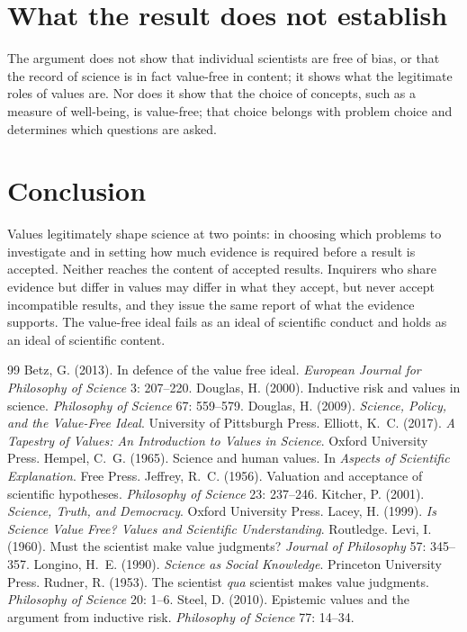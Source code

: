 \documentclass{situationist-preprint}
\begin{document}
\section{What the result does not establish}

The argument does not show that individual scientists are free of bias, or that the record of science is in fact value-free in content; it shows what the legitimate roles of values are. Nor does it show that the choice of concepts, such as a measure of well-being, is value-free; that choice belongs with problem choice and determines which questions are asked.

\section{Conclusion}

Values legitimately shape science at two points: in choosing which problems to investigate and in setting how much evidence is required before a result is accepted. Neither reaches the content of accepted results. Inquirers who share evidence but differ in values may differ in what they accept, but never accept incompatible results, and they issue the same report of what the evidence supports. The value-free ideal fails as an ideal of scientific conduct and holds as an ideal of scientific content.

\begin{thebibliography}{99}\small
{} Betz, G. (2013). In defence of the value free ideal. \emph{European Journal for Philosophy of Science} 3: 207--220.
 Douglas, H. (2000). Inductive risk and values in science. \emph{Philosophy of Science} 67: 559--579.
 Douglas, H. (2009). \emph{Science, Policy, and the Value-Free Ideal}. University of Pittsburgh Press.
 Elliott, K.~C. (2017). \emph{A Tapestry of Values: An Introduction to Values in Science}. Oxford University Press.
 Hempel, C.~G. (1965). Science and human values. In \emph{Aspects of Scientific Explanation}. Free Press.
 Jeffrey, R.~C. (1956). Valuation and acceptance of scientific hypotheses. \emph{Philosophy of Science} 23: 237--246.
 Kitcher, P. (2001). \emph{Science, Truth, and Democracy}. Oxford University Press.
 Lacey, H. (1999). \emph{Is Science Value Free? Values and Scientific Understanding}. Routledge.
 Levi, I. (1960). Must the scientist make value judgments? \emph{Journal of Philosophy} 57: 345--357.
 Longino, H.~E. (1990). \emph{Science as Social Knowledge}. Princeton University Press.
 Rudner, R. (1953). The scientist \emph{qua} scientist makes value judgments. \emph{Philosophy of Science} 20: 1--6.
 Steel, D. (2010). Epistemic values and the argument from inductive risk. \emph{Philosophy of Science} 77: 14--34.
\end{thebibliography}
\end{document}
